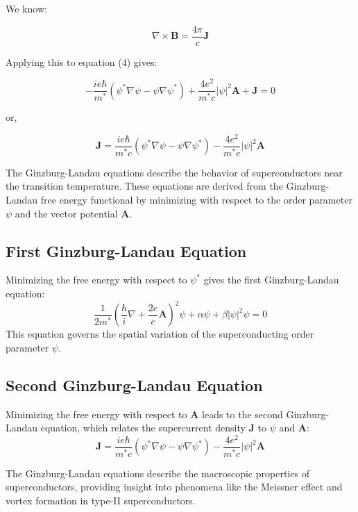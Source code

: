 \documentclass{article}
\begin{document}
We know:

\[
    \nabla \times \mathbf{B} = \frac{4\pi}{c} \mathbf{J}
\]

Applying this to equation (4) gives:

\begin{equation}
    - \frac{i e \hbar}{m^*} \left( \psi^* \nabla \psi - \psi \nabla \psi^* \right) + \frac{4 e^2}{m^* c} |\psi|^2 \mathbf{A} + \mathbf{J} = 0
\end{equation}

or,

\begin{equation}
    \mathbf{J} = \frac{i e \hbar}{m^* c} \left( \psi^* \nabla \psi - \psi \nabla \psi^* \right) - \frac{4 e^2}{m^* c} |\psi|^2 \mathbf{A} \tag{20}
\end{equation}

\begin{theorem}
The Ginzburg-Landau equations describe the behavior of superconductors near the transition temperature. These equations are derived from the Ginzburg-Landau free energy functional by minimizing with respect to the order parameter $\psi$ and the vector potential $\mathbf{A}$.

\subsection*{First Ginzburg-Landau Equation}
Minimizing the free energy with respect to $\psi^*$ gives the first Ginzburg-Landau equation:
\begin{equation}
    \frac{1}{2m^*} \left( \frac{\hbar}{i} \nabla + \frac{2e}{c} \mathbf{A} \right)^2 \psi + \alpha \psi + \beta |\psi|^2 \psi = 0
\end{equation}
This equation governs the spatial variation of the superconducting order parameter $\psi$.

\subsection*{Second Ginzburg-Landau Equation}
Minimizing the free energy with respect to $\mathbf{A}$ leads to the second Ginzburg-Landau equation, which relates the supercurrent density $\mathbf{J}$ to $\psi$ and $\mathbf{A}$:
\begin{equation}
    \mathbf{J} = \frac{i e \hbar}{m^* c} \left( \psi^* \nabla \psi - \psi \nabla \psi^* \right) - \frac{4 e^2}{m^* c} |\psi|^2 \mathbf{A}
\end{equation}

The Ginzburg-Landau equations describe the macroscopic properties of superconductors, providing insight into phenomena like the Meissner effect and vortex formation in type-II superconductors.

\end{theorem}
\end{document}
